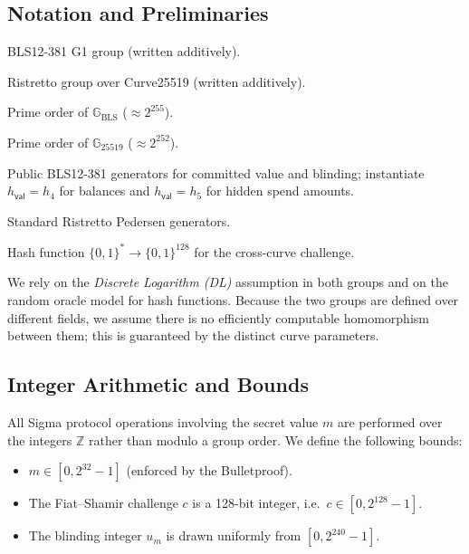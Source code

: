 \documentclass[11pt]{article}
\theoremstyle{definitionstyle}
\theoremstyle{plain}
\begin{document}
\subsection{Notation and Preliminaries}

\begin{description}[leftmargin=3.8cm,style=nextline]
\item[$\mathbb{G}_{\text{BLS}}$] BLS12-381 G1 group (written additively).
\item[$\mathbb{G}_{25519}$] Ristretto group over Curve25519 (written additively).
\item[$q_{\text{BLS}}$] Prime order of $\mathbb{G}_{\text{BLS}}$ ($\approx 2^{255}$).
\item[$q_{25519}$] Prime order of $\mathbb{G}_{25519}$ ($\approx 2^{252}$).
\item[$h_{\mathsf{val}}, h_0 \in \mathbb{G}_{\text{BLS}}$] Public BLS12-381 generators for committed value and blinding; instantiate $h_{\mathsf{val}} = h_4$ for balances and $h_{\mathsf{val}} = h_5$ for hidden spend amounts.
\item[$G, H \in \mathbb{G}_{25519}$] Standard Ristretto Pedersen generators.
\item[$\mathcal{H}_{128}$] Hash function $\{0,1\}^* \to \{0,1\}^{128}$ for the cross-curve challenge.
\end{description}

We rely on the \emph{Discrete Logarithm (DL)} assumption in both groups and on the random oracle model for hash functions. Because the two groups are defined over different fields, we assume there is no efficiently computable homomorphism between them; this is guaranteed by the distinct curve parameters.

\subsection{Integer Arithmetic and Bounds}

All Sigma protocol operations involving the secret value $m$ are performed over the integers $\mathbb{Z}$ rather than modulo a group order. We define the following bounds:

\begin{itemize}
\item $m \in [0, 2^{32}-1]$ (enforced by the Bulletproof).
\item The Fiat--Shamir challenge $c$ is a 128-bit integer, i.e.\ $c \in [0, 2^{128}-1]$.
\item The blinding integer $u_m$ is drawn uniformly from $[0, 2^{240}-1]$.
\end{itemize}
\end{document}
